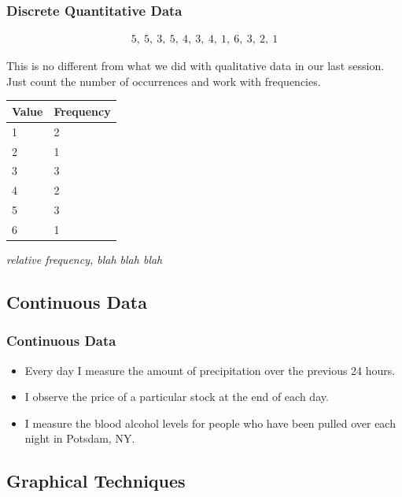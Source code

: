 \begin{frame}
  \frametitle{Discrete Quantitative Data}

  \begin{eqnarray*}
    5,~5,~3,~5,~4,~3,~4,~1,~6,~3,~2,~1
  \end{eqnarray*}

  This is no different from what we did with qualitative data in our
  last session. Just count the number of occurrences and work with
  frequencies.


  {
    \begin{tabular}{l|l}
      Value  & Frequency \\ \hline
      1 & 2 \\
      2 & 1 \\
      3 & 3 \\
      4 & 2 \\
      5 & 3 \\
      6 & 1 
    \end{tabular}
  }

  {
    \textit{relative frequency, blah blah blah}
  }

\end{frame}

\subsection{Continuous Data}

\begin{frame}
  \frametitle{Continuous Data}

  \begin{itemize}
  \item Every day I measure the amount of precipitation over the
    previous 24 hours.

  \item I observe the price of a particular stock at the end of each day.

  \item I measure the blood alcohol levels for people who have been
    pulled over each night in Potsdam, NY.
  \end{itemize}
\end{frame}

\subsection{Graphical Techniques}

